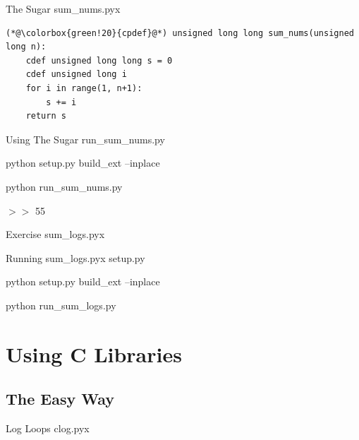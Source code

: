 \documentclass[11pt]{beamer}
\begin{document}
\begin{frame}[fragile]{The Sugar}
    sum\_nums.pyx
    \begin{lstlisting}
(*@\colorbox{green!20}{cpdef}@*) unsigned long long sum_nums(unsigned long n):
    cdef unsigned long long s = 0
    cdef unsigned long i
    for i in range(1, n+1):
        s += i
    return s
    \end{lstlisting}
\end{frame}

\begin{frame}[fragile]{Using The Sugar}
    run\_sum\_nums.py
    

	\vspace{1cm}

    \pause
    python setup.py build\_ext --inplace

    python run\_sum\_nums.py

    \pause
    $>>$ 55

\end{frame}

\begin{frame}[fragile]{Exercise}
    sum\_logs.pyx
    \pause
    
\end{frame}

\begin{frame}[fragile]{Running sum\_logs.pyx}
	setup.py
	
	
	\pause
	python setup.py build\_ext --inplace

	python run\_sum\_logs.py
\end{frame}

\section{Using C Libraries}
\subsection{The Easy Way}
\begin{frame}[fragile]{Log Loops}
    clog.pyx
    
\end{frame}
\end{document}
